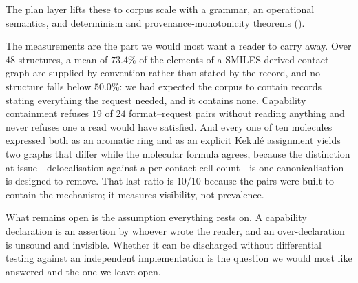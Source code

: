 \documentclass[11pt,twocolumn,a4paper]{article}
\theoremstyle{msthm}
\theoremstyle{definition}
\theoremstyle{remark}
\begin{document}
The plan layer lifts these to corpus scale with a grammar, an
operational semantics, and determinism and provenance-monotonicity
theorems ().

The measurements are the part we would most want a reader to carry away.
Over $48$ structures, a mean of $73.4\%$ of the elements of a
SMILES-derived contact graph are supplied by convention rather than
stated by the record, and no structure falls below $50.0\%$: we had
expected the corpus to contain records stating everything the request
needed, and it contains none. Capability containment refuses $19$ of
$24$ format--request pairs without reading anything and never refuses
one a read would have satisfied. And every one of ten molecules
expressed both as an aromatic ring and as an explicit Kekul\'e
assignment yields two graphs that differ while the molecular formula
agrees, because the distinction at issue---delocalisation against a
per-contact cell count---is one canonicalisation is designed to remove.
That last ratio is $10/10$ because the pairs were built to contain the
mechanism; it measures visibility, not prevalence.

What remains open is the assumption everything rests on. A capability
declaration is an assertion by whoever wrote the reader, and an
over-declaration is unsound and invisible. Whether it can be discharged
without differential testing against an independent implementation is
the question we would most like answered and the one we leave open.



\end{document}
